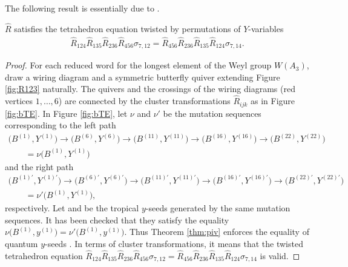 The following result is essentially due to \cite{SY22}.
\begin{Proposition}\label{pr:sy}
$\widehat{R}$ satisfies the tetrahedron equation twisted by permutations of $Y$-variables
\begin{align}\label{TE1}
\widehat{R} _{124}\widehat{R} _{135}\widehat{R} _{236} \widehat{R} _{456}\sigma_{7,12}=
\widehat{R} _{456}\widehat{R} _{236}\widehat{R} _{135}\widehat{R} _{124}\sigma_{7,14} .
\end{align}
\end{Proposition}
\begin{proof}
 For each reduced word for the longest element of the Weyl group
 $W(A_3)$, draw a wiring diagram and a symmetric butterfly quiver
 extending Figure \ref{fig:R123} naturally. The quivers and the
 crossings of the wiring diagrams (red vertices $1, \dots, 6$) are
 connected by the cluster transformations $\widehat{R}_{ijk}$ as in
 Figure \ref{fig:bTE}. %
In Figure \ref{fig:bTE},
let $\nu$ and $\nu'$ be the mutation sequences corresponding to the left path
\begin{gather*}
\bigl(B^{(1)},Y^{(1)}\bigr) \rightarrow
\bigl(B^{(6)},Y^{(6)}\bigr) \rightarrow
\bigl(B^{(11)},Y^{(11)}\bigr) \rightarrow
\bigl(B^{(16)},Y^{(16)}\bigr) \rightarrow
\bigl(B^{(22)},Y^{(22)}\bigr)\\
\qquad=\nu\bigl(B^{(1)},Y^{(1)}\bigr)
\end{gather*}
and the right path
\begin{gather*}
\bigl(B^{(1)\prime},Y^{(1)\prime}\bigr) \rightarrow
\bigl(B^{(6)\prime},Y^{(6)\prime}\bigr) \rightarrow
\bigl(B^{(11)\prime},Y^{(11)\prime}\bigr) \rightarrow
\bigl(B^{(16)\prime},Y^{(16)\prime}\bigr) \rightarrow
 \bigl(B^{(22)\prime},Y^{(22)\prime}\bigr)\\
 \qquad=\nu'\bigl(B^{(1)},Y^{(1)}\bigr),
\end{gather*}
 respectively.
Let  and  be the
tropical $y$-seeds generated by the same mutation sequences.
It has been checked \cite[Section~A.2]{SY22}
that they satisfy the equality
$\nu\bigl(B^{(1)},y^{(1)}\bigr)= \nu'\bigl(B^{(1)},y^{(1)}\bigr)$.
Thus Theorem \ref{thm:piv} enforces the equality of quantum $y$-seeds
.
In terms of cluster transformations, it means that the twisted tetrahedron equation
$\widehat{R}_{124}\widehat{R}_{135}\widehat{R}_{236}\widehat{R}_{456}\sigma_{7,12}
=\widehat{R}_{456}\widehat{R}_{236}\widehat{R}_{135}\widehat{R}_{124} \sigma_{7,14}$ is valid.
\end{proof}

